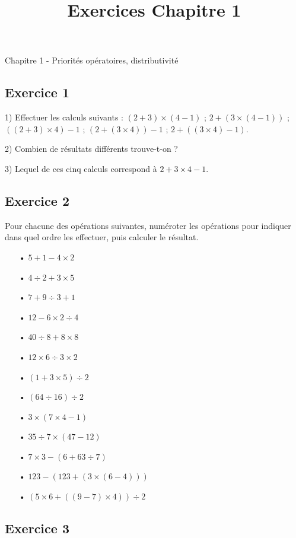 \documentclass[12 pt]{extarticle}
\title{Exercices Chapitre 1}
\date{}
\theoremstyle{plain}
\begin{document}
\begin{center}{\Large Chapitre 1 - Priorités opératoires, distributivité}\\ 
 \end{center}
 
 
 \subsection*{Exercice 1}

 
1) Effectuer les calculs suivants : $(2 + 3) \times (4 - 1)$ ; 
$ 2 + ( 3 \times (4 - 1) ) $ ; 
$( ( 2 + 3 ) \times 4 ) - 1 $ ; 
$ ( 2 + ( 3 \times 4 ) ) - 1$ ; 
$2 + ((3 \times 4) - 1)$. 

2) Combien de résultats différents trouve-t-on ? 

3) Lequel de ces cinq calculs correspond à $ 2 + 3 \times 4 - 1$.

\subsection*{Exercice 2}
 
 
 Pour chacune des opérations suivantes, numéroter les opérations 
 pour indiquer dans quel ordre les effectuer, puis calculer le 
 résultat. 
 \begin{itemize}
 \item[•] $5 + 1 - 4 \times 2$
 \item[•]$4 \div 2 + 3 \times 5$ 
 \item[•] $7 + 9 \div 3 + 1$
 \item[•] $12 - 6 \times 2 \div 4$
 \item[•] $40 \div 8 + 8 \times 8$
 \item[•] $12 \times 6 \div 3 \times 2$
 \item[•] $(1 + 3 \times 5) \div 2$
 \item[•] $(64\div 16) \div 2$
 \item[•] $3 \times ( 7 \times 4 -1)$
 \item[•] $35 \div 7\times (47-12)$
 \item[•] $ 7\times 3  - (6 + 63\div 7)$
 \item[•] $123 - (123 + (3 \times (6-4)))$
  \item[•] $ (5 \times 6+ ((9-7)\times 4))\div 2$
 \end{itemize}
 
 \subsection*{Exercice 3} 
 
\end{document}
